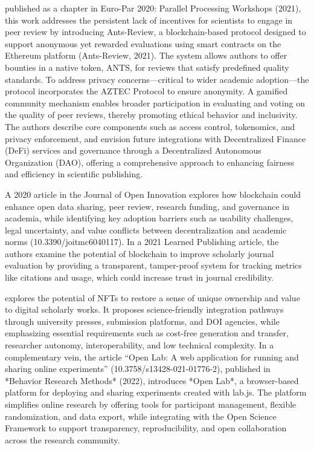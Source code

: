 \cite{trovo_ants-review_2021} published as a chapter in Euro-Par 2020: Parallel Processing Workshops (2021), this work addresses the persistent lack of incentives for scientists to engage in peer review by introducing Ants-Review, a blockchain-based protocol designed to support anonymous yet rewarded evaluations using smart contracts on the Ethereum platform (Ants-Review, 2021). The system allows authors to offer bounties in a native token, ANTS, for reviews that satisfy predefined quality standards. To address privacy concerns—critical to wider academic adoption—the protocol incorporates the AZTEC Protocol to ensure anonymity. A gamified community mechanism enables broader participation in evaluating and voting on the quality of peer reviews, thereby promoting ethical behavior and inclusivity. The authors describe core components such as access control, tokenomics, and privacy enforcement, and envision future integrations with Decentralized Finance (DeFi) services and governance through a Decentralized Autonomous Organization (DAO), offering a comprehensive approach to enhancing fairness and efficiency in scientific publishing.

\cite{kosmarski_blockchain_2020} A 2020 article in the Journal of Open Innovation explores how blockchain could enhance open data sharing, peer review, research funding, and governance in academia, while identifying key adoption barriers such as usability challenges, legal uncertainty, and value conflicts between decentralization and academic norms (10.3390/joitmc6040117). In a 2021 Learned Publishing article, the authors examine the potential of blockchain to improve scholarly journal evaluation by providing a transparent, tamper-proof system for tracking metrics like citations and usage, which could increase trust in journal credibility.

\cite{putnings_non-fungible_2022} explores the potential of NFTs to restore a sense of unique ownership and value to digital scholarly works. It proposes science-friendly integration pathways through university presses, submission platforms, and DOI agencies, while emphasizing essential requirements such as cost-free generation and transfer, researcher autonomy, interoperability, and low technical complexity. In a complementary vein, the article “Open Lab: A web application for running and sharing online experiments” (10.3758/s13428-021-01776-2), published in *Behavior Research Methods* (2022), introduces *Open Lab*, a browser-based platform for deploying and sharing experiments created with lab.js. The platform simplifies online research by offering tools for participant management, flexible randomization, and data export, while integrating with the Open Science Framework to support transparency, reproducibility, and open collaboration across the research community.

